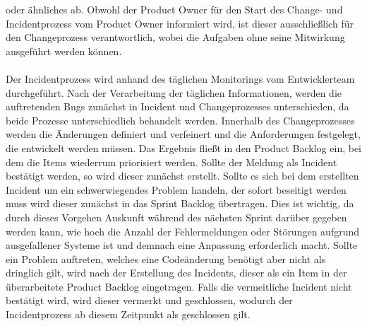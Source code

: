 oder ähnliches ab. Obwohl der Product Owner für den Start des Change- und Incidentprozess vom Product Owner informiert wird, ist dieser ausschließlich für den Changeprozess verantwortlich, wobei die Aufgaben ohne seine Mitwirkung ausgeführt werden können.\\\\ Der Incidentprozess wird anhand des täglichen Monitorings vom Entwicklerteam durchgeführt. Nach der Verarbeitung der täglichen Informationen, werden die auftretenden Bugs zunächst in Incident und Changeprozesses unterschieden, da beide Prozesse unterschiedlich behandelt werden. Innerhalb des Changeprozesses werden die Änderungen definiert und verfeinert und die Anforderungen festgelegt, die entwickelt werden müssen. Das Ergebnis fließt in den Product Backlog ein, bei dem die Items wiederrum priorisiert werden. Sollte der Meldung als Incident bestätigt werden, so wird dieser zunächst erstellt. Sollte es sich bei dem erstellten Incident um ein schwerwiegendes Problem handeln, der sofort beseitigt werden muss wird dieser zunächst in das Sprint Backlog übertragen. Dies ist wichtig, da durch dieses Vorgehen Auskunft während des nächsten Sprint darüber gegeben werden kann, wie hoch die Anzahl der Fehlermeldungen oder Störungen aufgrund ausgefallener Systeme ist und demnach eine Anpassung erforderlich macht. Sollte ein Problem auftreten, welches eine Codeänderung benötigt aber nicht als dringlich gilt, wird nach der Erstellung des Incidents, dieser als ein Item in der überarbeitete Product Backlog eingetragen. Falls die vermeitliche Incident nicht bestätigt wird, wird dieser vermerkt und geschlossen, wodurch der Incidentprozess ab diesem Zeitpunkt als geschlossen gilt.


